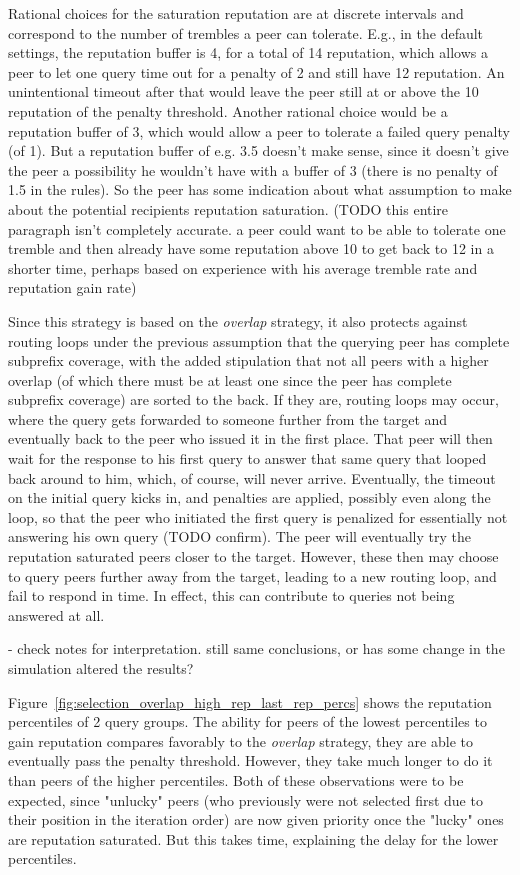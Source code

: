 Rational choices for the saturation reputation are at discrete intervals and
correspond to the number of trembles a peer can tolerate. E.g., in the default
settings, the reputation buffer is 4, for a total of 14 reputation, which allows
a peer to let one query time out for a penalty of 2 and still have 12
reputation. An unintentional timeout after that would leave the peer still at or
above the 10 reputation of the penalty threshold. Another rational choice would
be a reputation buffer of 3, which would allow a peer to tolerate a failed query
penalty (of 1). But a reputation buffer of e.g. 3.5 doesn't make sense, since it
doesn't give the peer a possibility he wouldn't have with a buffer of 3 (there
is no penalty of 1.5 in the rules). So the peer has some indication about what
assumption to make about the potential recipients reputation saturation. (TODO
this entire paragraph isn't completely accurate. a peer could want to be able to
tolerate one tremble and then already have some reputation above 10 to get back
to 12 in a shorter time, perhaps based on experience with his average tremble
rate and reputation gain rate)

Since this strategy is based on the \emph{overlap} strategy, it also protects
against routing loops under the previous assumption that the querying peer has
complete subprefix coverage, with the added stipulation that not all peers with
a higher overlap (of which there must be at least one since the peer has
complete subprefix coverage) are sorted to the back. If they are, routing loops
may occur, where the query gets forwarded to someone further from the target and
eventually back to the peer who issued it in the first place. That peer will
then wait for the response to his first query to answer that same query that
looped back around to him, which, of course, will never arrive. Eventually, the
timeout on the initial query kicks in, and penalties are applied, possibly even
along the loop, so that the peer who initiated the first query is penalized for
essentially not answering his own query (TODO confirm). The peer will eventually
try the reputation saturated peers closer to the target. However, these then may
choose to query peers further away from the target, leading to a new routing
loop, and fail to respond in time. In effect, this can contribute to queries not
being answered at all.

- check notes for interpretation. still same conclusions, or has some change in
  the simulation altered the results?

Figure~\ref{fig:selection_overlap_high_rep_last_rep_percs} shows the reputation
percentiles of 2 query groups. The ability for peers of the lowest percentiles
to gain reputation compares favorably to the \emph{overlap} strategy, they are
able to eventually pass the penalty threshold. However, they take much longer to
do it than peers of the higher percentiles. Both of these observations were to
be expected, since "unlucky" peers (who previously were not selected first due
to their position in the iteration order) are now given priority once the
"lucky" ones are reputation saturated. But this takes time, explaining the delay
for the lower percentiles.

